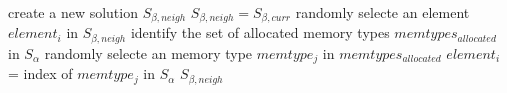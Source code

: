 \setlength{\textfloatsep}{0.2cm}
\begin{algorithm2e}[h]
	create a new solution $S_{\beta,neigh}$\;
	{
		$S_{\beta,neigh}=S_{\beta,curr}$\;
		randomly selecte an element $element_{i}$ in $S_{\beta,neigh}$\;
		identify the set of allocated memory types $memtypes_{allocated}$ in $S_{\alpha}$\;
		randomly selecte an memory type $memtype_{j}$ in $memtypes_{allocated}$\;
		$element_{i}$ = index of $memtype_{j}$ in $S_{\alpha}$\;
	}
	\Return $S_{\beta,neigh}$ \;
	\caption{$Neighbor_{\beta}()$}
	\label{algo:neighbor_beta}
\end{algorithm2e}
\setlength{\textfloatsep}{0.2cm}


